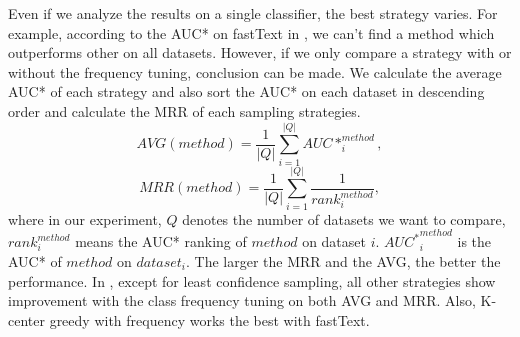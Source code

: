 Even if we analyze the results on a single classifier, 
the best strategy varies. For example, according to the AUC* on 
fastText in , we can't find a method which outperforms 
other on all datasets.  However, if we only compare a strategy with
or without the frequency tuning, conclusion can be made. We calculate the average AUC* of each strategy and also sort the AUC* on each dataset in 
descending order and calculate the MRR of 
each sampling strategies.
\begin{equation}
    AVG(method) = \frac{1}{|Q|}\sum_{i=1}^{|Q|}AUC*_i^{method},
\end{equation}
\begin{equation}
    MRR(method) = \frac{1}{|Q|}\sum_{i=1}^{|Q|}\frac{1}{rank_i^{method}},
\end{equation}
where in our experiment, $Q$ denotes the number of datasets we want to compare, $rank_i^{method}$ means the AUC* ranking of $method$ on dataset $i$. ${AUC^*}^{method}_{i}$ is the AUC* of $method$ on $dataset_i$.
The larger the MRR and the AVG, the better the performance. In , 
except for least confidence sampling, all other strategies show improvement
with the class frequency tuning on both AVG and MRR.
Also, K-center greedy with frequency works the best with fastText.

